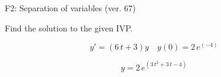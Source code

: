 \begin{exercise}
  \begin{exerciseTitle}F2: Separation of variables (ver. 67)\end{exerciseTitle}
  \begin{exerciseStatement}
    
Find the solution to the given IVP.

    
\[y'=( 6 \, t + 3 )y\hspace{1em} y(0)= 2 \, e^{\left(-4\right)}\]

  \end{exerciseStatement}
  \begin{exerciseAnswer}
    
\[y= 2 \, e^{\left(3 \, t^{2} + 3 \, t - 4\right)}\]

  \end{exerciseAnswer}
\end{exercise}